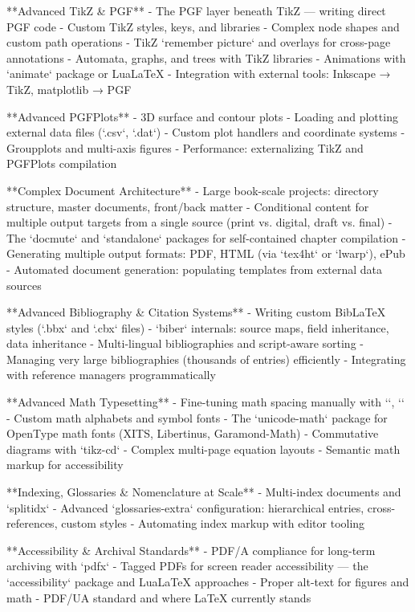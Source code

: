 **Advanced TikZ & PGF**
- The PGF layer beneath TikZ — writing direct PGF code
- Custom TikZ styles, keys, and libraries
- Complex node shapes and custom path operations
- TikZ `remember picture` and overlays for cross-page annotations
- Automata, graphs, and trees with TikZ libraries
- Animations with `animate` package or LuaLaTeX
- Integration with external tools: Inkscape → TikZ, matplotlib → PGF

**Advanced PGFPlots**
- 3D surface and contour plots
- Loading and plotting external data files (`.csv`, `.dat`)
- Custom plot handlers and coordinate systems
- Groupplots and multi-axis figures
- Performance: externalizing TikZ and PGFPlots compilation

**Complex Document Architecture**
- Large book-scale projects: directory structure, master documents, front/back matter
- Conditional content for multiple output targets from a single source (print vs. digital, draft vs. final)
- The `docmute` and `standalone` packages for self-contained chapter compilation
- Generating multiple output formats: PDF, HTML (via `tex4ht` or `lwarp`), ePub
- Automated document generation: populating templates from external data sources

**Advanced Bibliography & Citation Systems**
- Writing custom BibLaTeX styles (`.bbx` and `.cbx` files)
- `biber` internals: source maps, field inheritance, data inheritance
- Multi-lingual bibliographies and script-aware sorting
- Managing very large bibliographies (thousands of entries) efficiently
- Integrating with reference managers programmatically

**Advanced Math Typesetting**
- Fine-tuning math spacing manually with `\mspace`, `\mkern`
- Custom math alphabets and symbol fonts
- The `unicode-math` package for OpenType math fonts (XITS, Libertinus, Garamond-Math)
- Commutative diagrams with `tikz-cd`
- Complex multi-page equation layouts
- Semantic math markup for accessibility

**Indexing, Glossaries & Nomenclature at Scale**
- Multi-index documents and `splitidx`
- Advanced `glossaries-extra` configuration: hierarchical entries, cross-references, custom styles
- Automating index markup with editor tooling

**Accessibility & Archival Standards**
- PDF/A compliance for long-term archiving with `pdfx`
- Tagged PDFs for screen reader accessibility — the `accessibility` package and LuaLaTeX approaches
- Proper alt-text for figures and math
- PDF/UA standard and where LaTeX currently stands

